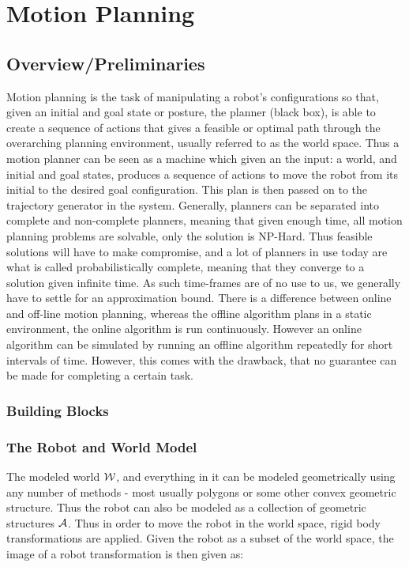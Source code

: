 \chapter{Motion Planning}


\section{Overview/Preliminaries}
Motion planning is the task of manipulating a robot's configurations so that,
given an initial and goal state or posture, the planner (black box), is able to
create a sequence of actions that gives a feasible or optimal path through the
overarching planning environment, usually referred to as the world space. Thus a
motion planner can be seen as a machine which given an the input: a world, and
initial and goal states, produces a sequence of actions to move the robot from
its initial to the desired goal configuration. This plan is then passed on to
the trajectory generator in the system. Generally, planners can be separated
into complete and non-complete planners, meaning that given enough time, all
motion planning problems are solvable, only the solution is NP-Hard. Thus
feasible solutions will have to make compromise, and a lot of planners in use
today are what is called probabilistically complete, meaning that they converge
to a solution given infinite time. As such time-frames are of no use to us, we
generally have to settle for an approximation bound. There is a difference
between online and off-line motion planning, whereas the offline algorithm plans
in a static environment, the online algorithm is run continuously. However an
online algorithm can be simulated by running an offline algorithm repeatedly for
short intervals of time. However, this comes with the drawback, that no
guarantee can be made for completing a certain task.

\subsection{Building Blocks}

\subsection{The Robot and World Model}

The modeled world \(\mathcal{W}\), and everything in it can be modeled
geometrically using any number of methods - most usually polygons or some other
convex geometric structure. Thus the robot can also be modeled as a collection
of geometric structures \(\mathcal{A}\). Thus in order to move the robot in the
world space, rigid body transformations are applied. Given the robot as a subset
of the world space, the image of a robot transformation is then given as:

